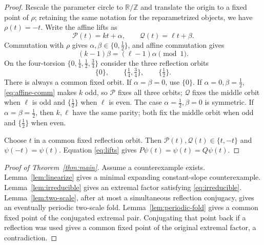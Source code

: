 \documentclass[11pt]{article}
\begin{document}
\begin{proof}
Rescale the parameter circle to $\mathbb R/\mathbb Z$ and translate the origin to a fixed point of
$\rho$; retaining the same notation for the reparametrized objects, we have $\rho(t)=-t$. Write the
affine lifts as
\[
\mathcal P(t)=kt+\alpha,\qquad \mathcal Q(t)=\ell t+\beta.
\]
Commutation with $\rho$ gives
$\alpha,\beta\in\{0,\tfrac12\}$, and affine commutation gives
\begin{equation}\label{eq:affine-comm}
(k-1)\beta=(\ell-1)\alpha\pmod1.
\end{equation}
On the four-torsion
$\{0,\tfrac14,\tfrac12,\tfrac34\}$ consider the three reflection orbits
\[
\{0\},\qquad\{\tfrac14,\tfrac34\},\qquad\{\tfrac12\}.
\]
There is always a common fixed orbit. If $\alpha=\beta=0$, use $\{0\}$. If
$\alpha=0,\beta=\tfrac12$, \eqref{eq:affine-comm} makes $k$ odd, so $\mathcal P$ fixes all three orbits;
$\mathcal Q$ fixes the middle orbit when $\ell$ is odd and $\{\tfrac12\}$ when $\ell$ is even. The
case $\alpha=\tfrac12,\beta=0$ is symmetric. If $\alpha=\beta=\tfrac12$, then $k,\ell$ have the same
parity; both fix the middle orbit when odd and $\{\tfrac12\}$ when even.

Choose $t$ in a common fixed reflection orbit. Then
$\mathcal P(t),\mathcal Q(t)\in\{t,-t\}$ and $\psi(-t)=\psi(t)$. Equation \eqref{eq:lifts} gives
$P\psi(t)=\psi(t)=Q\psi(t)$.
\end{proof}

\begin{proof}[Proof of Theorem~\ref{thm:main}]
Assume a counterexample exists. Lemma~\ref{lem:linearize} gives a minimal expanding constant-slope
counterexample. Lemma~\ref{lem:irreducible} gives an extremal factor satisfying
\eqref{eq:irreducible}. Lemma~\ref{lem:two-scale}, after at most a simultaneous reflection conjugacy,
gives an eventually periodic two-scale fold. Lemma~\ref{lem:periodic-fold} gives a common fixed point of
the conjugated extremal pair. Conjugating that point back if a reflection was used gives a common fixed
point of the original extremal factor, a contradiction.
\end{proof}
\end{document}
